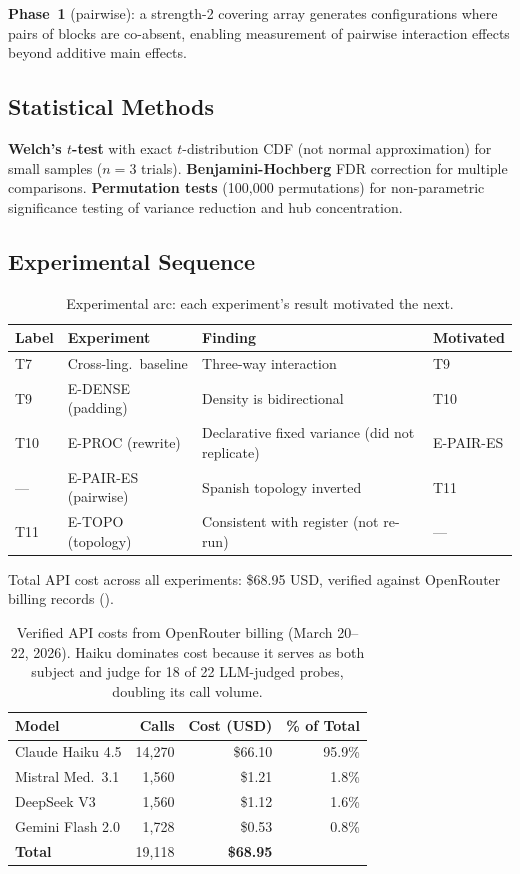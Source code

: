 \documentclass[11pt,a4paper]{article}
\begin{document}
\textbf{Phase~1} (pairwise): a strength-2 covering array generates
configurations where pairs of blocks are co-absent, enabling
measurement of pairwise interaction effects beyond additive main
effects.

\subsection{Statistical Methods}

\textbf{Welch's $t$-test} with exact $t$-distribution CDF (not
normal approximation) for small samples ($n = 3$ trials).
\textbf{Benjamini-Hochberg} FDR correction for multiple comparisons.
\textbf{Permutation tests} (100,000 permutations) for
non-parametric significance testing of variance reduction and hub
concentration.

\subsection{Experimental Sequence}

\begin{table}[ht]
\centering
\caption{Experimental arc: each experiment's result motivated the next.}
\label{tab:sequence}
\begin{tabular}{llll}
\toprule
Label & Experiment & Finding & Motivated \\
\midrule
T7  & Cross-ling.\ baseline & Three-way interaction & T9 \\
T9  & E-DENSE (padding) & Density is bidirectional & T10 \\
T10 & E-PROC (rewrite) & Declarative fixed variance (did not replicate) & E-PAIR-ES \\
--- & E-PAIR-ES (pairwise) & Spanish topology inverted & T11 \\
T11 & E-TOPO (topology) & Consistent with register (not re-run) & --- \\
\bottomrule
\end{tabular}
\end{table}

Total API cost across all experiments: \$68.95 USD, verified against
OpenRouter billing records ().

\begin{table}[ht]
\centering
\caption{Verified API costs from OpenRouter billing (March 20--22, 2026).
Haiku dominates cost because it serves as both subject and judge for
18 of 22 LLM-judged probes, doubling its call volume.}
\label{tab:costs}
\begin{tabular}{lrrr}
\toprule
Model & Calls & Cost (USD) & \% of Total \\
\midrule
Claude Haiku 4.5  & 14,270 & \$66.10 & 95.9\% \\
Mistral Med.\ 3.1 &  1,560 & \$1.21  & 1.8\% \\
DeepSeek V3       &  1,560 & \$1.12  & 1.6\% \\
Gemini Flash 2.0  &  1,728 & \$0.53  & 0.8\% \\
\midrule
\textbf{Total}    & 19,118 & \textbf{\$68.95} & \\
\bottomrule
\end{tabular}
\end{table}
\end{document}
